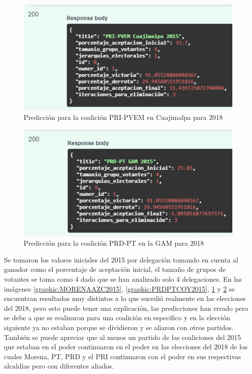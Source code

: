 \begin{figure}[!htb]
    \centering
    \includegraphics[scale=.5]{TT/img/pruebas/PRI-PVEM Cuajimalpa 2015.png}
    \caption{Predicción para la coalición PRI-PVEM en Cuajimalpa para 2018}
    \label{graphic:PRIPVEM2015}
\end{figure}

\begin{figure}[!htb]
    \centering
    \includegraphics[scale=.5]{TT/img/pruebas/PRD-PT GAM 2015.png}
    \caption{Predicción para la coalición PRD-PT en la GAM para 2018}
    \label{graphic:PRDPT2015}
\end{figure}


Se tomaron los valores iniciales del 2015 por delegación tomando en cuenta al ganador como el porcentaje de aceptación inicial, el tamaño de grupos de votantes se toma como 4 dado que se han analizado solo 4 delegaciones. En las imágenes \ref{graphic:MORENAAZC2015}, \ref{graphic:PRDPTCOY2015}, \ref{graphic:PRIPVEM2015} y \ref{graphic:PRDPT2015} se encuentran resultados muy distintos a lo que sucedió realmente en las elecciones del 2018, pero esto puede tener una explicación, las predicciones han errado pero se debe a que se realizaron para una coalición en especifico y en la elección siguiente ya no estaban porque se dividieron y se aliaron con otros partidos. También se puede apreciar que al menos un partido de las coaliciones del 2015 que estaban en el poder continuaron en el poder en las elecciones del 2018 de los cuales Morena, PT, PRD y el PRI continuaron con el poder en sus respectivas alcaldías pero con diferentes aliados.

